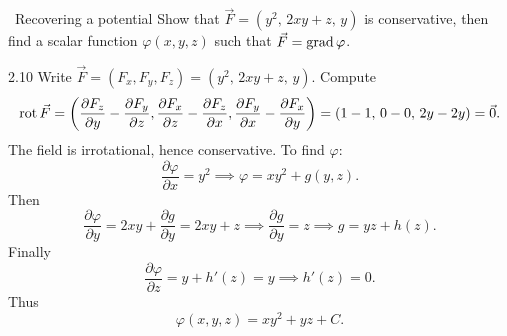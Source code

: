 \begin{exercise}{\mastery\ Recovering a potential}
Show that
$\vec F=(y^2,\,2xy+z,\,y)$
is conservative, then find a scalar function $\varphi(x,y,z)$ such that
$\vec F=\operatorname{grad}\varphi$.
\end{exercise}

\begin{tabletworkspace}[6.5cm]
\end{tabletworkspace}

\begin{solution}{2.10}
Write $\vec F=(F_x,F_y,F_z)=(y^2,\,2xy+z,\,y)$. Compute
\[
\operatorname{rot}\vec F=
\left(
\frac{\partial F_z}{\partial y}-\frac{\partial F_y}{\partial z},
\frac{\partial F_x}{\partial z}-\frac{\partial F_z}{\partial x},
\frac{\partial F_y}{\partial x}-\frac{\partial F_x}{\partial y}
\right)
=(1-1,\,0-0,\,2y-2y)=\vec{0}.
\]
The field is irrotational, hence conservative. To find $\varphi$:
\[
\frac{\partial\varphi}{\partial x}=y^2
\implies \varphi=xy^2+g(y,z).
\]
Then
\[
\frac{\partial\varphi}{\partial y}=2xy+\frac{\partial g}{\partial y}=2xy+z
\implies \frac{\partial g}{\partial y}=z
\implies g=yz+h(z).
\]
Finally
\[
\frac{\partial\varphi}{\partial z}=y+h'(z)=y
\implies h'(z)=0.
\]
Thus
\[
\varphi(x,y,z)=xy^2+yz+C.
\]
\end{solution}

